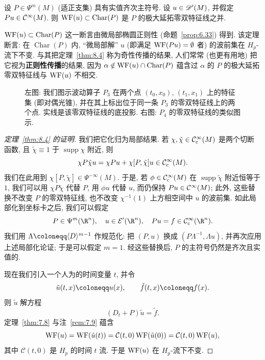 \begin{theorem}\label{thm:8.4}
设 $P \in \Psi^m(M)$ (适正支集) 具有实值齐次主符号. 设 $u \in \mathscr{D}'(M)$, 并假定 $Pu \in \mathcal{C}^\infty(M)$. 则 $\operatorname{WF}(u) \subset \operatorname{Char}(P)$ 是 $P$ 的极大延拓零双特征线之并.
\end{theorem}

$\operatorname{WF}(u) \subset \operatorname{Char}(P)$ 这一断言由微局部椭圆正则性 (命题~\ref{prop:6.33}) 得到. 该定理断言: 在 $\operatorname{Char}(P)$ 内, ``微局部解'' $u$ (即满足 $\operatorname{WF}(Pu) = \emptyset$ 者) 的波前集在 $H_p$-流下不变. 与其把定理~\ref{thm:8.4} 称为奇性传播的结果, 人们常常 (也更有用地) 把它视为\textbf{正则性传播}的结果, 因为 $\alpha \notin \operatorname{WF}(u) \cap \operatorname{Char}(P)$ 蕴含过 $\alpha$ 的 $P$ 的极大延拓零双特征线与 $\operatorname{WF}(u)$ 不相交.

\begin{figure}[htbp]
\centering
\drawFigEightOne
\caption{左图: 我们图示波动算子 $P_3$ 在两个点 $(t_0, x_0)$, $(t_1, x_1)$ 上的特征集 (即对偶光锥), 并在其上标出位于同一条 $P_3$ 的零双特征线上的两个点. 实线是该零双特征线的底投影. 右图: $P_4$ 的零双特征线的类似图示.}
\label{fig:8.1}
\end{figure}

\begin{proof}[定理~\ref{thm:8.4} 的证明]
我们把它化归为局部结果. 若 $\chi, \tilde{\chi} \in \mathcal{C}_{\mathrm{c}}^\infty(M)$ 是两个切断函数, 且 $\tilde{\chi} \equiv 1$ 于 $\operatorname{supp}\chi$ 附近, 则
\begin{equation}\label{eq:8.10}
    \chi P \tilde{\chi} u = \chi P u + \chi [P, \tilde{\chi}] u \in \mathcal{C}_{\mathrm{c}}^\infty(M).
\end{equation}
我们在此用到 $\chi [P, \tilde{\chi}] \in \Psi^{-\infty}(M)$. 于是, 若 $\phi \in \mathcal{C}_{\mathrm{c}}^\infty(M)$ 在 $\operatorname{supp}\tilde{\chi}$ 附近恒等于 $1$, 我们可以用 $\chi P \tilde{\chi}$ 代替 $P$, 用 $\phi u$ 代替 $u$, 而仍保持 $Pu \in \mathcal{C}^\infty(M)$; 此外, 这些替换不改变 $P$ 的零双特征线, 也不改变 $\chi^{-1}(1)$ 上方相空间中 $u$ 的波前集. 如此局部化到坐标卡之后, 我们可以假定
\begin{equation}\label{eq:8.11}
    P \in \Psi^m(\R^n), \quad u \in \mathcal{E}'(\R^n), \quad Pu = f \in \SmoothComp(\R^n).
\end{equation}
我们用 $\Lambda \defeq \langle D \rangle^{m-1}$ 作规范化: 把 $(P, u)$ 换成 $(P\Lambda^{-1}, \Lambda u)$, 并再次应用上述局部化论证; 于是可以假定 $m = 1$. 经这些替换后, $P$ 的主符号仍然是齐次且实值的.

现在我们引入一个人为的时间变量 $t$, 并令
\begin{equation}\label{eq:8.12}
    \tilde{u}(t, x) \defeq u(x), \qquad \tilde{f}(t, x) \defeq f(x).
\end{equation}
则 $\tilde{u}$ 解方程
\begin{equation}\label{eq:8.13}
    (D_t + P)\tilde{u} = \tilde{f}.
\end{equation}
定理~\ref{thm:7.8} 与注~\ref{rem:7.9} 蕴含
\begin{equation}\label{eq:8.14}
    \operatorname{WF}(u) = \operatorname{WF}(\tilde{u}(t)) = \mathcal{C}(t, 0)\operatorname{WF}(\tilde{u}(0)) = \mathcal{C}(t, 0)\operatorname{WF}(u),
\end{equation}
其中 $\mathcal{C}(t, 0)$ 是 $H_p$ 的时间 $t$ 流. 于是 $\operatorname{WF}(u)$ 在 $H_p$-流下不变.
\end{proof}

